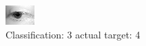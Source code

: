 \begin{figure}[h!]
\begin{center}
\includegraphics[width=0.60\columnwidth]{figures/ID2578_class_3_target_4.png}
\end{center}
\caption{ Classification: 3 actual target: 4}
\label{fig:ID2578_class_3_target_4}
\end{figure}
